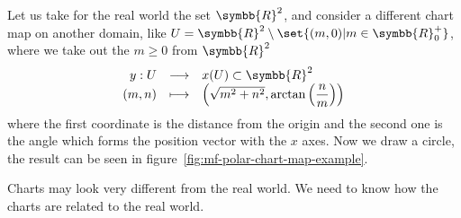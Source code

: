 Let us take for the real world the set $\symbb{R}^2$, and consider a different chart map on
another domain, like $U = \symbb{R}^2 \setminus\set{(m,0)|m\in\symbb{R}_0^+}$, where we take
out the $m\geq 0$ from $\symbb{R}^2$
\[
  \begin{array}{rcl}
    y : U & \longrightarrow & x(U)\subset\symbb{R}^2\\
    (m,n) & \longmapsto & \left(\sqrt{m^2+n^2},\arctan{\left(\dfrac{n}{m}\right)}\right)
  \end{array}
\]
where the first coordinate is the distance from the origin and the second one is the angle which
forms the position vector with the $x$ axes.
Now we draw a circle, the result can be seen in figure~\ref{fig:mf-polar-chart-map-example}.

Charts may look very different from the real world. We need to know how the charts are
related to the real world.

